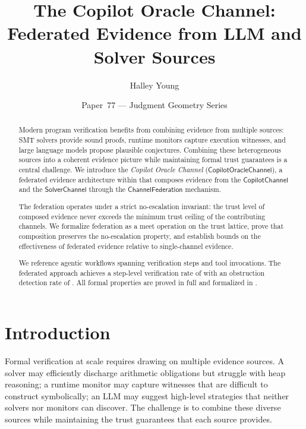 \documentclass[11pt]{article}
\title{\textbf{The Copilot Oracle Channel:\\
Federated Evidence from LLM and Solver Sources}}
\author{Halley Young}
\date{Paper~77 --- Judgment Geometry Series}
\newcommand{\CopOracle}{\mathsf{CopilotOracleChannel}}
\newcommand{\CopChan}{\mathsf{CopilotChannel}}
\newcommand{\SolChan}{\mathsf{SolverChannel}}
\newcommand{\ChanFed}{\mathsf{ChannelFederation}}
\begin{document}
\maketitle

\begin{abstract}
Modern program verification benefits from combining evidence from
multiple sources: SMT solvers provide sound proofs, runtime monitors
capture execution witnesses, and large language models propose
plausible conjectures.  Combining these heterogeneous sources into
a coherent evidence picture while maintaining formal trust guarantees
is a central challenge.  We introduce the \emph{Copilot Oracle
Channel} ($\CopOracle$), a federated evidence architecture within
\JuGeo{} that composes evidence from the $\CopChan$ and the
$\SolChan$ through the $\ChanFed$ mechanism.

The federation operates under a strict no-escalation invariant:
the trust level of composed evidence never exceeds the minimum
trust ceiling of the contributing channels.  We formalize
federation as a meet operation on the trust lattice, prove that
composition preserves the no-escalation property, and establish
bounds on the effectiveness of federated evidence relative to
single-channel evidence.

We reference \pSevenSevenWorkflows{} agentic workflows spanning
\pSevenSevenSteps{} verification steps and
\pSevenSevenToolCalls{} tool invocations.  The federated approach
achieves a step-level verification rate of
\pSevenSevenStepVerifRate{} with an obstruction detection rate of
\pSevenSevenDiagnosisRate.  All formal properties are proved in
full and formalized in \LEAN.
\end{abstract}

\section{Introduction}
\label{sec:intro}

Formal verification at scale requires drawing on multiple evidence
sources.  A solver may efficiently discharge arithmetic obligations
but struggle with heap reasoning; a runtime monitor may capture
witnesses that are difficult to construct symbolically; an LLM
may suggest high-level strategies that neither solvers nor monitors
can discover.  The challenge is to combine these diverse sources
while maintaining the trust guarantees that each source provides.
\end{document}
